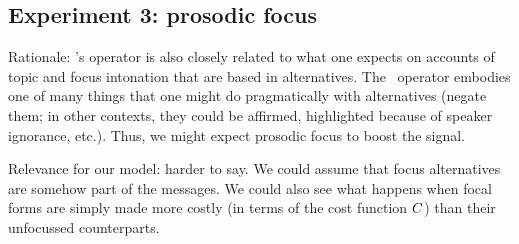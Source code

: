 \documentclass{article}
\begin{document}
\subsection{Experiment 3: prosodic focus}\label{sec:exp3}

\begin{examples}
\item Rationale: \CFS's operator is also closely related to what one
  expects on accounts of topic and focus intonation that are based in
  alternatives. The \ALT\ operator embodies one of many things that
  one might do pragmatically with alternatives (negate them; in other
  contexts, they could be affirmed, highlighted because of speaker
  ignorance, etc.). Thus, we might expect prosodic focus to boost the
  signal.

\item Relevance for our model: harder to say. We could assume that
  focus alternatives are somehow part of the messages. We could also
  see what happens when focal forms are simply made more costly (in
  terms of the cost function $C$) than their unfocussed
  counterparts.
\end{examples}




\end{document}
